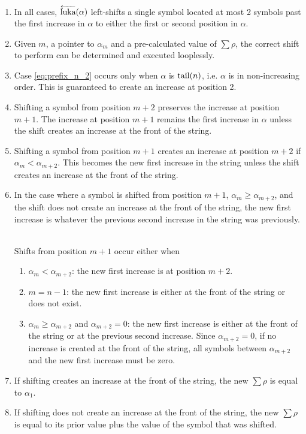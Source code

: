 \begin{enumerate}
    \item In all cases, $\overleftarrow{\text{luka}}(\alpha)$ left-shifts a single symbol located at most 2 symbols past the first increase in $\alpha$ to either the first or second position in $\alpha$.  
    \item Given $m$, a pointer to $\alpha_m$ and a pre-calculated value of $\sum{\rho}$, the correct shift to perform can be determined and executed looplessly.
    \item Case \eqref{eq:prefix_n_2} occurs only when $\alpha$ is $\operatorname{tail}(n)$, i.e. $\alpha$ is in non-increasing order. This is guaranteed to create an increase at position 2.

    \item Shifting a symbol from position $m+2$ preserves the increase at position $m+1$.  The increase at position $m+1$ remains the first increase in $\alpha$ unless the shift creates an increase at the front of the string.

    \item Shifting a symbol from position $m+1$ creates an increase at position $m+2$ if $\alpha_m < \alpha_{m+2}$.  This becomes the new first increase in the string unless the shift creates an increase at the front of the string.

    \item In the case where a symbol is shifted from position $m+1$, $\alpha_m \ge \alpha_{m+2}$, and the shift does not create an increase at the front of the string, the new first increase is whatever the previous second increase in the string was previously. \

Shifts from position $m+1$ occur either when 
        \begin{enumerate}
            \item $\alpha_m < \alpha_{m+2}$: the new first increase is at position $m+2$.
            \item $m=n-1$: the new first increase is either at the front of the string or does not exist.
	    \item $\alpha_m \ge \alpha_{m+2}$ and $\alpha_{m+2} = 0$: the new first increase is either at the front of the string or at the previous second increase.  Since $\alpha_{m+2}=0$, if no increase is created at the front of the string, all symbols between $\alpha_{m+2}$ and the new first increase must be zero. \label{reasonforstack}
        \end{enumerate}
    \item If shifting creates an increase at the front of the string, the new $\sum{\rho}$ is equal to $\alpha_1$.
    \item If shifting does not create an increase at the front of the string, the new $\sum{\rho}$ is equal to its prior value plus the value of the symbol that was shifted.
         
\end{enumerate}

